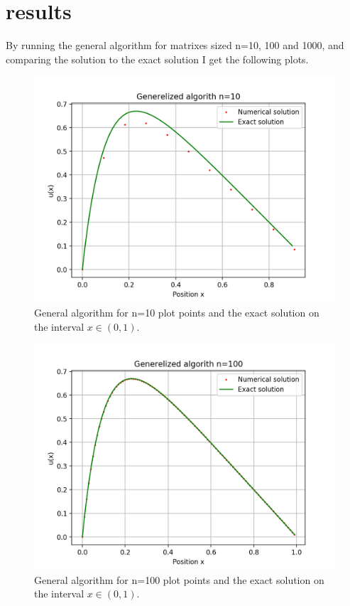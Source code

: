 \documentclass[12pt]{article}
\begin{document}
\section{results}

By running the general algorithm for matrixes sized n=10, 100 and 1000, and comparing the solution to the exact solution I get the following plots. 

\begin{figure}[H]
  \center
  \includegraphics[scale=0.5]{alg-0-n10plot.png}
  \caption{General algorithm for n=10 plot points and the exact solution on the interval $x\in (0,1)$.}
  \label{fig:plotn10}
\end{figure}
\begin{figure}[H]
  \center
  \includegraphics[scale=0.5]{alg-0-n100plot.png}  \caption{General algorithm for n=100 plot points and the exact solution on the interval $x\in (0,1)$.}
  \label{fig:plotn100}
\end{figure}
\end{document}
